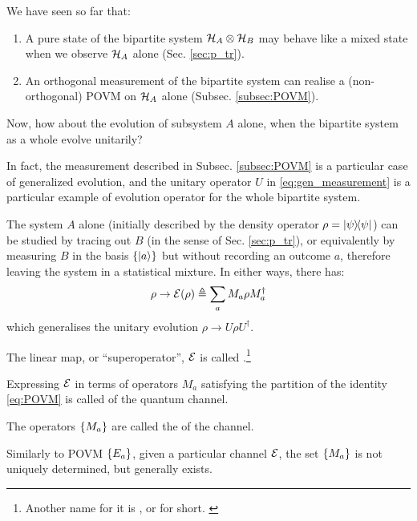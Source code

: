 We have seen so far that:
\begin{enumerate}
\item
  A pure state of the bipartite system $\mathcal{H}_A\otimes\mathcal{H}_B$
  may behave like a mixed state when we observe $\mathcal{H}_A$ alone
  (Sec. \ref{sec:p_tr}).
\item
  An orthogonal measurement of the bipartite system can realise a
  (non-orthogonal) POVM on $\mathcal{H}_A$ alone (Subsec. \ref{subsec:POVM}).
\end{enumerate}
Now, how about the evolution of subsystem $A$ alone,
when the bipartite system as a whole evolve unitarily?

In fact, the measurement described in Subsec. \ref{subsec:POVM}
is a particular case of generalized evolution, and the unitary operator $U$
in \eqref{eq:gen_measurement} is a particular example of
evolution operator for the whole bipartite system.

The system $A$ alone
(initially described by the density operator $\rho=\ketbra{\psi}$)
can be studied by tracing out $B$
(in the sense of Sec. \ref{sec:p_tr}),
or equivalently by measuring $B$ in the basis $\left\{\ket{a}\right\}$
but without recording an outcome $a$, therefore leaving the system
in a statistical mixture.
In either ways, there has:
\begin{equation}\label{eq:channel}
  \rho \rightarrow \mathcal{E}(\rho) \triangleq \sum_a M_a \rho M_a^{\dagger}
\end{equation}
which generalises the unitary evolution $\rho \rightarrow U \rho U^{\dagger}$.

The linear map, or ``superoperator'', $\mathcal{E}$
is called .\footnote{
  Another name for it is
  ,
  or  for short. \parencite[Sec. 3.2]{PreskillNotes}
}

Expressing $\mathcal{E}$ in terms of operators $M_a$
satisfying the partition of the identity \eqref{eq:POVM}
is called
 of the quantum channel.

The operators $\left\{M_a\right\}$ are called the 
of the channel.

Similarly to POVM $\left\{E_a\right\}$, given a particular channel $\mathcal{E}$,
the set $\left\{M_a\right\}$ is not uniquely determined, but
generally exists.

